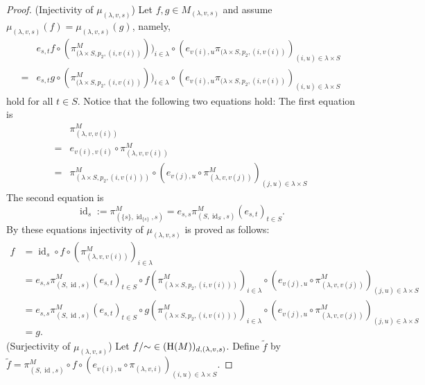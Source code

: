 \documentclass[a4paper,10pt]{article}
\theoremstyle{definition}
\DeclareMathOperator{\id}{id}
\newcommand\mc{\mathclose}
\begin{document}
\begin{proof}
(Injectivity of $\mu_{(\lambda,v,s)}$)
Let $f,g\in M_{(\lambda,v,s)}$ and assume $\mu_{(\lambda,v,s)}(f)=\mu_{(\lambda,v,s)}(g)$,
namely,
\begin{align*}
&e_{s,t}f\circ(\pi_{(\lambda\times S,p_2,(i,v(i))}^M))_{i\in\lambda}
 \circ (e_{v(i),u}\pi_{(\lambda\times S,p_2,(i,v(i))})_{(i,u)\in\lambda\times S}\\
=&e_{s,t}g\circ(\pi_{(\lambda\times S,p_2,(i,v(i))}^M))_{i\in\lambda}
 \circ (e_{v(i),u}\pi_{(\lambda\times S,p_2,(i,v(i))})_{(i,u)\in\lambda\times S}
\end{align*}
hold for all $t\in S$.
Notice that the following two equations hold: The first equation is
\begin{align*}
 &\pi_{(\lambda,v,v(i))}^M\\
=&e_{v(i),v(i)}\circ \pi_{(\lambda,v,v(i))}^M \\
=&\pi_{(\lambda\times S,p_2,(i,v(i)))}^M
 \circ (e_{v(j),u}\circ \pi_{(\lambda,v,v(j))}^M)_{(j,u)\in\lambda\times S}%
\end{align*}
The second equation is
\[
\id_s:=\pi_{(\{s\},\id_{\{s\}},s)}^M=e_{s,s}\pi_{(S,\id_S,s)}^M (e_{s,t})_{t\in S}.
\]
By these equations injectivity of $\mu_{(\lambda,v,s)}$ is proved as follows:
\begin{align*}
f
&=\id_s\circ f\circ (\pi_{(\lambda,v,v(i))}^M)_{i\in\lambda}\\
&=e_{s,s}\pi_{(S,\id,s)}^M (e_{s,t})_{t\in S}\circ f
 (\pi_{(\lambda\times S,p_2,(i,v(i)))}^M)_{i\in\lambda}
 \circ (e_{v(j),u}\circ \pi_{(\lambda,v,v(j))}^M)_{(j,u)\in \lambda\times S}\\
&=e_{s,s}\pi_{(S,\id,s)}^M (e_{s,t})_{t\in S}\circ g
 (\pi_{(\lambda\times S,p_2,(i,v(i)))}^M)_{i\in\lambda}
 \circ (e_{v(j),u}\circ \pi_{(\lambda,v,v(j))}^M)_{(j,u)\in \lambda\times S}\\
&=g.
\end{align*}
(Surjectivity of $\mu_{(\lambda,v,s)}$)
Let $f/\mc\sim\in ({\rm H}(M))_{d,(\lambda,v,s)}$. Define $\tilde{f}$ by
$\tilde{f}=\pi_{(S,\id,s)}^M\circ f\circ
(e_{v(i),u}\circ\pi_{(\lambda,v,i)})_{(i,u)\in \lambda\times S}$.

\end{proof}
\end{document}
